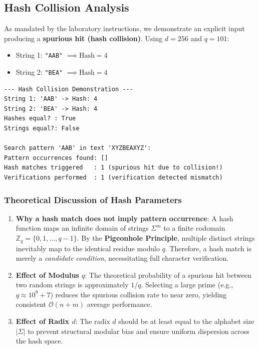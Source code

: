 \documentclass[12pt]{article}
\begin{document}
\subsection{Hash Collision Analysis}
As mandated by the laboratory instructions, we demonstrate an explicit input producing a \textbf{spurious hit (hash collision)}.
Using $d = 256$ and $q = 101$:
\begin{itemize}
    \item String 1: \texttt{"AAB"} $\implies \text{Hash} = 4$
    \item String 2: \texttt{"BEA"} $\implies \text{Hash} = 4$
\end{itemize}

\begin{lstlisting}[style=output, caption={Hash Collision Demonstration}]
--- Hash Collision Demonstration ---
String 1: 'AAB' -> Hash: 4
String 2: 'BEA' -> Hash: 4
Hashes equal? : True
Strings equal?: False

Search pattern 'AAB' in text 'XYZBEAXYZ':
Pattern occurrences found: []
Hash matches triggered   : 1 (spurious hit due to collision!)
Verifications performed  : 1 (verification detected mismatch)
\end{lstlisting}

\subsubsection{Theoretical Discussion of Hash Parameters}
\begin{enumerate}
    \item \textbf{Why a hash match does not imply pattern occurrence}:
    A hash function maps an infinite domain of strings $\Sigma^m$ to a finite codomain $\mathbb{Z}_q = \{0, 1, \dots, q-1\}$. By the \textbf{Pigeonhole Principle}, multiple distinct strings inevitably map to the identical residue modulo $q$. Therefore, a hash match is merely a \emph{candidate condition}, necessitating full character verification.
    \item \textbf{Effect of Modulus $q$}:
    The theoretical probability of a spurious hit between two random strings is approximately $1/q$. Selecting a large prime (e.g., $q \approx 10^9+7$) reduces the spurious collision rate to near zero, yielding consistent $\mathcal{O}(n + m)$ average performance.
    \item \textbf{Effect of Radix $d$}:
    The radix $d$ should be at least equal to the alphabet size $|\Sigma|$ to prevent structural modular bias and ensure uniform dispersion across the hash space.
\end{enumerate}
\end{document}
